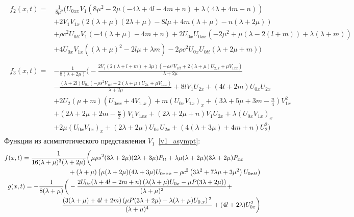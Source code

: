 \documentclass[12pt, a4paper]{report}
\newcommand{\lb}{\left (}
\newcommand{\rb}{\right )}
\begin{document}
\begin{align}
\nonumber
\begin{split}
f_2(x, t) =& \, \frac{1}{8 \mu ^2} \bigg(U_{0xx} V_1 \left(8\mu^2 - 2\mu(-4\lambda + 4l - 4m + n) + \lambda(4\lambda + 4m - n)\right) \\
&+ 2V_1 V_{1x} (2 (\lambda + \mu) (2\lambda + \mu) - 8l\mu + 4m(\lambda + \mu) - n(\lambda + 2\mu)) \\
&+ \rho c^2 U_{0tt}V_1 (-4(\lambda + \mu) - 4m + n) + 2U_{0x}U_{0xx} \left(-2\mu^2 + \mu(\lambda - 2(l + m)) + \lambda (\lambda + m)\right) \\
&+ 4 U_{0x} V_{1x} \left((\lambda + \mu)^2 - 2l\mu + \lambda m\right) - 2\rho c^2 U_{0x}U_{0tt} (\lambda + 2\mu + m)\bigg)
\end{split}\\
\nonumber
\begin{split}
f_3(x, t) =& -\frac{1}{8 (\lambda +2 \mu )}\bigg(-\frac{2 V_1 (2 (\lambda +l+m)+3 \mu ) \left(-\rho  s^2 V_{1tt}+2 (\lambda +\mu ) U_{2,x}+\mu  V_{1xx}\right)}{\lambda +2 \mu }\\
&-\frac{(\lambda +2 l) U_{0x} \left(-\rho  s^2 V_{1tt}+2 (\lambda +\mu ) U_{2x}+\mu  V_{1xx}\right)}{\lambda +2 \mu }+8 l V_1 U_{2x} + (4l + 2m)U_{0x} U_{2x}\\
&+2 U_2 (\mu +m) \left(U_{0xx}+4 V_{1,x}\right)+m (U_{0x}V_{1x})_x + \lb 3\lambda + 5\mu + 3m -\frac{n}{4}\rb V_{1x}^2\\
&+\lb 2\lambda + 2\mu + 2m-\frac{n}{2}\rb V_1 V_{1xx}+(2\lambda + 2\mu + n) V_1 U_{2x} + \lambda(U_{0x}V_{1x})_x\\
&+ 2\mu(U_{0x} V_{1x})_x + (2\lambda + 2\mu)U_{0x}U_{2x} + (4 (\lambda +3 \mu )+4 m+n) U_2^2 \bigg)
\end{split}
\end{align}
Функции из асимптотического представления $V_1$~\eqref{v1_asympt}:
\begin{align}
\nonumber
\begin{split}
f(x,t) &= \frac{1}{16 (\lambda +\mu )^3 (\lambda +2 \mu )}\bigg(\mu  \rho  s^2 (3 \lambda +2 \mu ) (2 \lambda +3 \mu ) P_{tt}+\lambda  \mu  (\lambda +2 \mu ) (3 \lambda +2 \mu ) P_{xx}\\
&\hspace{25mm}+(\lambda +\mu ) \left(\mu  (\lambda +2 \mu ) (4 \lambda +3 \mu ) U_{0xxx}-\rho c^2 \left(3 \lambda ^2+7 \lambda  \mu +3 \mu ^2\right) U_{0xtt}\right)
\end{split}\\
\nonumber
\begin{split}
g(x,t) &= -\frac{1}{8(\lambda + \mu)}\bigg(-\frac{2U_{0x}(\lambda + 4l - 2m + n) \left(\lambda(\lambda + \mu) U_{0x} - \mu P (3\lambda + 2\mu)\right)}{(\lambda + \mu)^2} + \\
&\hspace{20mm}\frac{(3 (\lambda +\mu )+4 l+2 m) \left(\mu  P (3 \lambda +2 \mu )-\lambda  (\lambda +\mu ) U_{0,x}\right){}^2}{(\lambda +\mu )^4} + (4l + 2\lambda)  U_{0x}^2\bigg)
\end{split}
\end{align}
\end{document}
